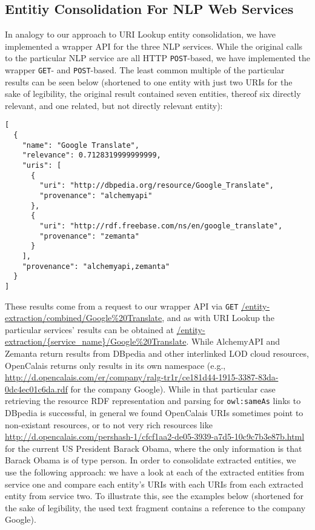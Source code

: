 \documentclass{acm_proc_article-sp}
\begin{document}
\subsection{Entitiy Consolidation For NLP Web Services}\label{sec:consolidation2}
In analogy to our approach to URI Lookup entity consolidation, we have implemented a wrapper API for the three NLP services. While the original calls to the particular NLP service are all HTTP \texttt{POST}-based, we have implemented the wrapper \texttt{GET}- and \texttt{POST}-based. The least common multiple of the particular results can be seen below (shortened to one entity with just two URIs for the sake of legibility, the original result contained seven entities, thereof six directly relevant, and one related, but not directly relevant entity):
\begin{verbatim}
[ 
  {
    "name": "Google Translate",
    "relevance": 0.7128319999999999,
    "uris": [
      {
        "uri": "http://dbpedia.org/resource/Google_Translate",
        "provenance": "alchemyapi"
      },
      {
        "uri": "http://rdf.freebase.com/ns/en/google_translate",
        "provenance": "zemanta"
      }
    ],
    "provenance": "alchemyapi,zemanta"
  }
]
\end{verbatim}
These results come from a request to our wrapper API via \texttt{GET} \url{/entity-extraction/combined/Google%20Translate}, and as with URI Lookup the particular services' results can be obtained at \url{/entity-extraction/{service_name}/Google%
\end{document}

